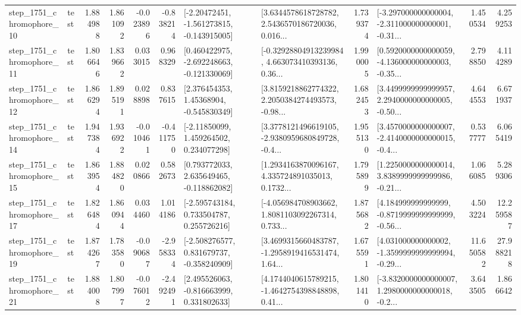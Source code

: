 \begin{tabular}{llrrrrllrlrr}
 step\_1751\_chromophore\_10 &      test &      1.884988 &    1.861092 &     -0.023896 & -0.838214 &   [-2.20472451, -1.561273815, -0.143915005] &  [3.6344578618728782, 2.5436570186720036, 0.016... &       1.739374 &  [-3.297000000000004, -2.311000000000001, -0.31... &            1.450534 &          4.259253 \\
 step\_1751\_chromophore\_11 &      test &      1.806646 &    1.839662 &      0.033015 &  0.968329 &   [0.460422975, -2.692248663, -0.121330069] &  [-0.32928804913239984, 4.663073410393136, 0.36... &       1.990005 &  [0.5920000000000059, -4.136000000000003, -0.35... &            2.798850 &          4.114289 \\
 step\_1751\_chromophore\_12 &      test &      1.866294 &    1.895191 &      0.028898 &  0.837615 &     [2.376454353, 1.45368904, -0.545830349] &  [3.8159218862774322, 2.2050384274493573, -0.98... &       1.682453 &  [3.4499999999999957, 2.2940000000000005, -0.50... &            4.644553 &          6.671937 \\
 step\_1751\_chromophore\_14 &      test &      1.947384 &    1.936922 &     -0.010461 & -0.411750 &     [-2.11850099, 1.459264502, 0.234077298] &  [3.3778121496619105, -2.9380959680849728, -0.4... &       1.955130 &  [3.4570000000000007, -2.4140000000000015, -0.4... &            0.537777 &          6.065419 \\
 step\_1751\_chromophore\_15 &      test &      1.863954 &    1.884820 &      0.020866 &  0.582673 &    [0.793772033, 2.635649465, -0.118862082] &  [1.2934163870096167, 4.335724891035013, 0.1732... &       1.795899 &  [1.2250000000000014, 3.8389999999999986, -0.21... &            1.066085 &          5.289306 \\
 step\_1751\_chromophore\_17 &      test &      1.826484 &    1.860944 &      0.034460 &  1.014186 &    [-2.595743184, 0.733504787, 0.255726216] &  [-4.056984708903662, 1.8081103092267314, 0.733... &       1.875682 &  [4.184999999999999, -0.8719999999999999, -0.56... &            4.503224 &         12.259587 \\
 step\_1751\_chromophore\_19 &      test &      1.874267 &    1.783580 &     -0.090687 & -2.958334 &   [-2.508276577, 0.831679737, -0.358240909] &  [3.4699315660483787, -1.2958919416531474, 1.64... &       1.675591 &  [4.031000000000002, -1.3599999999999994, -0.29... &           11.650582 &         27.988218 \\
 step\_1751\_chromophore\_21 &      test &      1.884008 &    1.807997 &     -0.076012 & -2.492491 &    [2.495526063, -0.816663999, 0.331802633] &  [4.1744040615789215, -1.4642754398848898, 0.41... &       1.801410 &  [-3.8320000000000007, 1.2980000000000018, -0.2... &            3.643505 &          1.866642 \\

\end{tabular}
